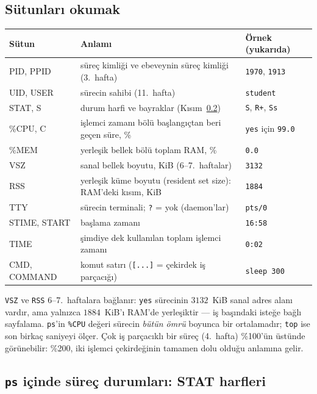 \documentclass[11pt,a4paper]{article}
\newcommand{\cmd}[1]{\texttt{#1}}
\begin{document}
\subsection{Sütunları okumak}

\begin{center}
\renewcommand{\arraystretch}{1.25}
\begin{tabularx}{\linewidth}{>{\ttfamily}l >{\raggedright\arraybackslash}X l}
\toprule
\textbf{\rmfamily Sütun} & \textbf{Anlamı} & \textbf{Örnek (yukarıda)} \\
\midrule
PID, PPID & süreç kimliği ve ebeveynin süreç kimliği (3.~hafta) & \texttt{1970}, \texttt{1913}\\
UID, USER & sürecin sahibi (11.~hafta) & \texttt{student}\\
STAT, S & durum harfi ve bayraklar (Kısım~\ref{sec:stat}) & \texttt{S}, \texttt{R+}, \texttt{Ss}\\
\%CPU, C & işlemci zamanı bölü başlangıçtan beri geçen süre, \% & \cmd{yes} için \texttt{99.0}\\
\%MEM & yerleşik bellek bölü toplam RAM, \% & \texttt{0.0}\\
VSZ & sanal bellek boyutu, KiB (6--7.~haftalar) & \texttt{3132}\\
RSS & yerleşik küme boyutu (resident set size): RAM'deki kısım, KiB & \texttt{1884}\\
TTY & sürecin terminali; \texttt{?} = yok (daemon'lar) & \texttt{pts/0}\\
STIME, START & başlama zamanı & \texttt{16:58}\\
TIME & şimdiye dek kullanılan toplam işlemci zamanı & \texttt{0:02}\\
CMD, COMMAND & komut satırı (\texttt{[...]} = çekirdek iş parçacığı) & \texttt{sleep 300}\\
\bottomrule
\end{tabularx}
\end{center}

\texttt{VSZ} ve \texttt{RSS} 6--7.~haftalara bağlanır: \cmd{yes} sürecinin $3132$~KiB sanal adres alanı vardır, ama yalnızca $1884$~KiB'ı RAM'de yerleşiktir --- iş başındaki isteğe bağlı sayfalama. \cmd{ps}'in \texttt{\%CPU} değeri sürecin \emph{bütün ömrü} boyunca bir ortalamadır; \cmd{top} ise son birkaç saniyeyi ölçer. Çok iş parçacıklı bir süreç (4.~hafta) \%100'ün üstünde görünebilir: \%200, iki işlemci çekirdeğinin tamamen dolu olduğu anlamına gelir.

\subsection{\texttt{ps} içinde süreç durumları: STAT harfleri}
\label{sec:stat}
\end{document}
